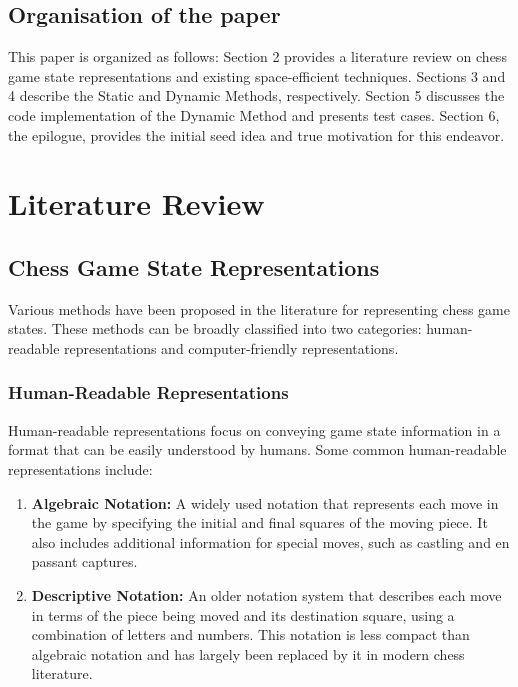 \documentclass{article}
\begin{document}
\subsection{Organisation of the paper}
This paper is organized as follows: Section 2 provides a literature review on chess game state representations and existing space-efficient techniques. Sections 3 and 4 describe the Static and Dynamic Methods, respectively. Section 5 discusses the code implementation of the Dynamic Method and presents test cases. Section 6, the epilogue, provides the initial seed idea and true motivation for this endeavor.

\newpage
\section{Literature Review}  
\subsection{Chess Game State Representations}  
Various methods have been proposed in the literature for representing chess game states. These methods can be broadly classified into two categories: human-readable representations and computer-friendly representations.  
   
\subsubsection{Human-Readable Representations}  
Human-readable representations focus on conveying game state information in a format that can be easily understood by humans. Some common human-readable representations include:  
   
\begin{enumerate}  
  \item \textbf{Algebraic Notation:} A widely used notation that represents each move in the game by specifying the initial and final squares of the moving piece. It also includes additional information for special moves, such as castling and en passant captures.  
    
  \item \textbf{Descriptive Notation:} An older notation system that describes each move in terms of the piece being moved and its destination square, using a combination of letters and numbers. This notation is less compact than algebraic notation and has largely been replaced by it in modern chess literature.  
\end{enumerate}  
   
\end{document}

